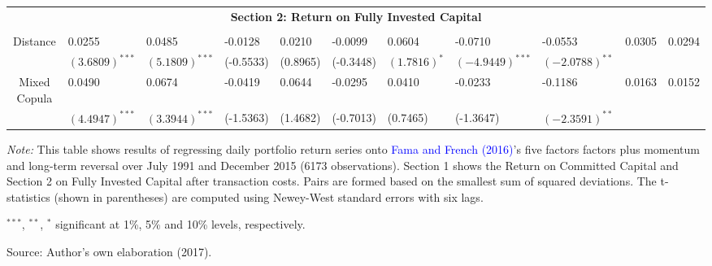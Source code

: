 \documentclass[a4paper,12pt]{report}
\begin{document}
\begin{sidewaystable}
\begin{threeparttable}[H]
\begin{tabularx}{\textwidth}{@{\extracolsep{\fill}} lllllllllll@{}}
			&       &       &       &       &       &       &       &       &       &       \\
			\midrule
			\multicolumn{11}{c}{\textbf{Section 2: Return on Fully Invested Capital}} \\
			&       &       &       &       &       &       &       &       &       &    \\
			\multicolumn{1}{c}{Distance} & 0.0255 & 0.0485 & -0.0128 & 0.0210 & -0.0099 & 0.0604 & -0.0710 & -0.0553 & 0.0305 & 0.0294 \\
			\multicolumn{1}{c}{} & $(3.6809)^{***}$ & $(5.1809)^{***}$ & (-0.5533) & (0.8965) & (-0.3448) & $(1.7816)^{*}$ & $(-4.9449)^{***}$ & $(-2.0788)^{**}$ & & \\
			\multicolumn{1}{c}{Mixed Copula} & 0.0490 & 0.0674 & -0.0419 & 0.0644 & -0.0295 & 0.0410 & -0.0233 & -0.1186 & 0.0163 & 0.0152 \\
			\multicolumn{1}{c}{} & $(4.4947)^{***}$ & $(3.3944)^{***}$ & (-1.5363) & (1.4682) & (-0.7013) & (0.7465) & (-1.3647) & $(-2.3591)^{**}$ & & \\
			\bottomrule
		\end{tabularx}
		\begin{tablenotes}
			\item \textit{Note:} \tiny  This table shows results of regressing daily portfolio return series onto \textcolor{blue}{Fama and French} \textcolor{blue}{(2016)}'s five factors factors plus momentum and long-term reversal over July 1991 and December 2015 (6173 observations). Section 1 shows the Return on Committed Capital and Section 2 on Fully Invested Capital after transaction costs. Pairs are formed based on the smallest sum of squared deviations. The t-statistics (shown in parentheses) are computed using Newey-West standard errors with six lags.
			\item \scriptsize $^{\ast\ast\ast}$, $^{\ast\ast}$, $^{\ast}$  significant at 1\%, 5\% and 10\% levels, respectively.
			\item Source: Author's own elaboration (2017).
		\end{tablenotes}
	\end{threeparttable}%
	\label{tab:table104}%
\end{sidewaystable}%
\end{document}
